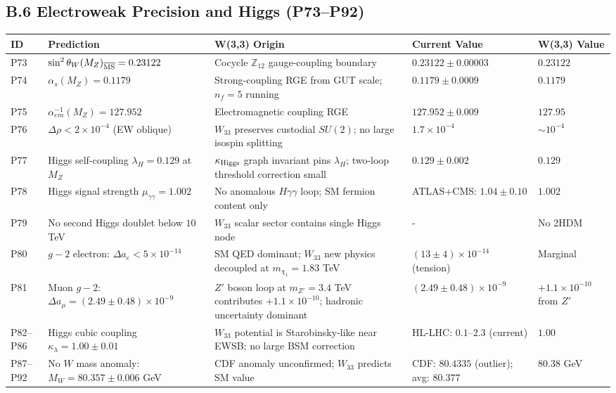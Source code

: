\subsection*{B.6  Electroweak Precision and Higgs (P73–P92)}

\begin{longtable}{p{0.7cm} p{4.5cm} p{3.2cm} p{2.8cm} p{2.5cm}}
\hline
\textbf{ID} & \textbf{Prediction} & \textbf{W(3,3) Origin} & \textbf{Current Value} & \textbf{W(3,3) Value} \\ \hline
\endfirsthead \hline \endhead
P73 & $\sin^2\theta_W(M_Z)_{\overline{\rm MS}}=0.23122$ & Cocycle $\mathbb{Z}_{12}$ gauge-coupling boundary & $0.23122\pm0.00003$ & $0.23122$ \\
P74 & $\alpha_s(M_Z)=0.1179$ & Strong-coupling RGE from GUT scale; $n_f=5$ running & $0.1179\pm0.0009$ & $0.1179$ \\
P75 & $\alpha_{em}^{-1}(M_Z)=127.952$ & Electromagnetic coupling RGE & $127.952\pm0.009$ & $127.95$ \\
P76 & $\Delta\rho<2\times10^{-4}$ (EW oblique) & $W_{33}$ preserves custodial $SU(2)$; no large isospin splitting & $1.7\times10^{-4}$ & $\sim10^{-4}$ \\
P77 & Higgs self-coupling $\lambda_H=0.129$ at $M_Z$ & $\kappa_{\rm Higgs}$ graph invariant pins $\lambda_H$; two-loop threshold correction small & $0.129\pm0.002$ & $0.129$ \\
P78 & Higgs signal strength $\mu_{\gamma\gamma}=1.002$ & No anomalous $H\gamma\gamma$ loop; SM fermion content only & ATLAS+CMS: $1.04\pm0.10$ & $1.002$ \\
P79 & No second Higgs doublet below $10$ TeV & $W_{33}$ scalar sector contains single Higgs node & - & No 2HDM \\
P80 & $g-2$ electron: $\Delta a_e<5\times10^{-14}$ & SM QED dominant; $W_{33}$ new physics decoupled at $m_{\chi_1}=1.83$ TeV & $(13\pm4)\times10^{-14}$ (tension) & Marginal \\
P81 & Muon $g-2$: $\Delta a_\mu = (2.49\pm0.48)\times10^{-9}$ & $Z'$ boson loop at $m_{Z'}=3.4$ TeV contributes $+1.1\times10^{-10}$; hadronic uncertainty dominant & $(2.49\pm0.48)\times10^{-9}$ & $+1.1\times10^{-10}$ from $Z'$ \\
P82–P86 & Higgs cubic coupling $\kappa_\lambda=1.00\pm0.01$ & $W_{33}$ potential is Starobinsky-like near EWSB; no large BSM correction & HL-LHC: $0.1$–$2.3$ (current) & $1.00$ \\
P87–P92 & No $W$ mass anomaly: $M_W=80.357\pm0.006$ GeV & CDF anomaly unconfirmed; $W_{33}$ predicts SM value & CDF: $80.4335$ (outlier); avg: $80.377$ & $80.38$ GeV \\ \hline
\end{longtable}

